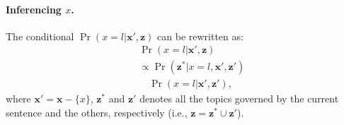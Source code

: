 
\paragraph{Inferencing $x$.}  The conditional $\Pr(x =
l|\mathbf{x}',\mathbf{z})$ can be rewritten as: 
\begin{eqnarray*}
  && \Pr(x = l|\mathbf{x}',\mathbf{z}) \nonumber\\
  && \propto \Pr(\mathbf{z}^*|x = l, \mathbf{x}', \mathbf{z}') \nonumber\\
  && \quad \Pr(x = l |\mathbf{x}',\mathbf{z}'),
\end{eqnarray*}
where $\mathbf{x}' =
\mathbf{x} - \{x\}$, $\mathbf{z}^*$ and $\mathbf{z}'$ denotes all the topics
governed by the current sentence and the others, respectively (i.e.,
$\mathbf{z} = \mathbf{z}^* \cup \mathbf{z}'$).

